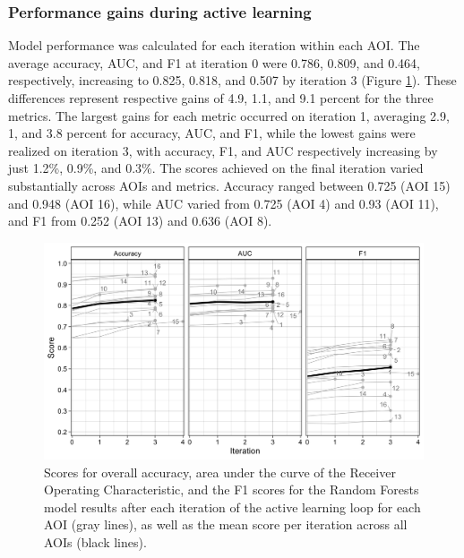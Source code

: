 \documentclass[11pt,a4paper]{article}
\begin{document}
\hypertarget{performance-gains-during-active-learning}{%
\subsubsection{Performance gains during active
learning}\label{performance-gains-during-active-learning}}

Model performance was calculated for each iteration within each AOI. The
average accuracy, AUC, and F1 at iteration 0 were 0.786, 0.809, and
0.464, respectively, increasing to 0.825, 0.818, and 0.507 by iteration
3 (Figure \ref{fig:alperformance}). These differences represent
respective gains of 4.9, 1.1, and 9.1 percent for the three metrics. The
largest gains for each metric occurred on iteration 1, averaging 2.9, 1,
and 3.8 percent for accuracy, AUC, and F1, while the lowest gains were
realized on iteration 3, with accuracy, F1, and AUC respectively
increasing by just 1.2\%, 0.9\%, and 0.3\%. The scores achieved on the
final iteration varied substantially across AOIs and metrics. Accuracy
ranged between 0.725 (AOI 15) and 0.948 (AOI 16), while AUC varied from
0.725 (AOI 4) and 0.93 (AOI 11), and F1 from 0.252 (AOI 13) and 0.636
(AOI 8).

\begin{figure}

{\centering \includegraphics[width=1\linewidth]{figures/figure5} 

}

\caption{Scores for overall accuracy, area under the curve of the Receiver Operating Characteristic, and the F1 scores for the Random Forests model results after each iteration of the active learning loop for each AOI (gray lines), as well as the mean score per iteration across all AOIs (black lines).}\label{fig:alperformance}
\end{figure}
\end{document}
